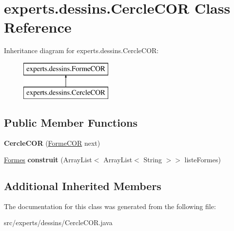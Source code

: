 \hypertarget{classexperts_1_1dessins_1_1_cercle_c_o_r}{}\section{experts.\+dessins.\+Cercle\+C\+OR Class Reference}
\label{classexperts_1_1dessins_1_1_cercle_c_o_r}
Inheritance diagram for experts.\+dessins.\+Cercle\+C\+OR\+:\begin{figure}[H]
\begin{center}
\leavevmode
\includegraphics[height=2.000000cm]{d2/d83/classexperts_1_1dessins_1_1_cercle_c_o_r}
\end{center}
\end{figure}
\subsection*{Public Member Functions}
\begin{DoxyCompactItemize}
\item 
\mbox{\label{classexperts_1_1dessins_1_1_cercle_c_o_r_a7c0fc61a749f55ff8bbdd59ca92a7f04}} 
{\bfseries Cercle\+C\+OR} (\mbox{\hyperlink{classexperts_1_1dessins_1_1_forme_c_o_r}{Forme\+C\+OR}} next)
\item 
\mbox{\label{classexperts_1_1dessins_1_1_cercle_c_o_r_a79d577f058d61b76c25245e5d4d1f022}} 
\mbox{\hyperlink{classdessin_1_1_formes}{Formes}} {\bfseries construit} (Array\+List$<$ Array\+List$<$ String $>$$>$ liste\+Formes)
\end{DoxyCompactItemize}
\subsection*{Additional Inherited Members}


The documentation for this class was generated from the following file\+:\begin{DoxyCompactItemize}
\item 
src/experts/dessins/Cercle\+C\+O\+R.\+java\end{DoxyCompactItemize}
